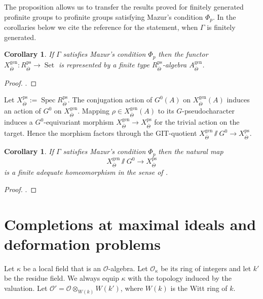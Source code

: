 \documentclass{amsart}
\newtheorem{cor}[prop]{Corollary}
\theoremstyle{definition}
\theoremstyle{remark}
\DeclareMathOperator{\Spec}{Spec}
\DeclareMathOperator{\Set}{Set}
\newcommand{\OO}{\mathcal O}
\newcommand{\gen}{\mathrm{gen}}
\newcommand{\Thetabar}{\overline{\Theta}}
\newcommand{\ps}{\mathrm{ps}}
\begin{document}
The proposition  allows us to transfer the results proved for finitely generated 
profinite groups to profinite groups satisfying Mazur's condition $\Phi_p$. 
In the corollaries below we cite the reference for the statement, when $\Gamma$ 
is finitely generated. 

\begin{cor} If $\Gamma$ satisfies Mazur's condition $\Phi_p$ then the 
functor $X^{\gen}_{\Thetabar}: R^{\ps}_{\Thetabar} \rightarrow \Set$ 
is represented by a finite type $R^{\ps}_{\Thetabar}$-algebra $A^{\gen}_{\Thetabar}$. 
\end{cor} 
\begin{proof} \cite[Proposition 8.3]{defG}.
\end{proof} 



Let $X^{\ps}_{\Thetabar}:=\Spec R^{\ps}_{\Thetabar}$. The conjugation action of $G^0(A)$ on $X^{\gen}_{\Thetabar}(A)$ induces
an action of $G^0$ on $X^{\gen}_{\Thetabar}$.
Mapping $\rho\in X^{\gen}_{\Thetabar}(A)$ to its 
$G$-pseudocharacter induces a $G^0$-equivariant
morphism $X^{\gen}_{\Thetabar} \rightarrow X^{\ps}_{\Thetabar}$ for the trivial action on the 
target. Hence the morphism factors through the 
GIT-quotient $X^{\gen}_{\Thetabar}\sslash G^0 \rightarrow X^{\ps}_{\Thetabar}$.


\begin{cor} If $\Gamma$ satisfies Mazur's condition $\Phi_p$ then the 
natural map 
$$X^{\gen}_{\Thetabar}\sslash G^0 \rightarrow X^{\ps}_{\Thetabar}$$
is a finite adequate homeomorphism in the sense of \cite[Definition 3.3.1]{alper}.
\end{cor} 
\begin{proof} \cite[Theorem 4.12]{inf_laf}.
\end{proof}


\section{Completions at maximal ideals and deformation problems}

Let $\kappa$ be a local field that is an $\OO$-algebra.  Let $\OO_{\kappa}$ be its ring of integers and let $k'$ be the residue field. 
We always equip $\kappa$ with the topology induced by the valuation. Let $\OO'=\OO\otimes_{W(k)} W(k')$, where $W(k)$ is the Witt ring of $k$.
\end{document}
